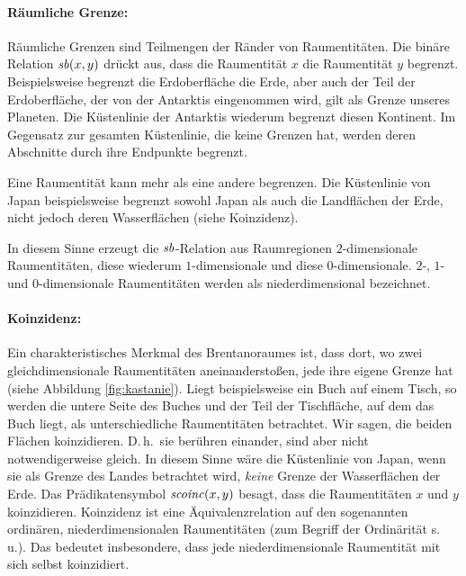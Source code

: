  \paragraph{Räumliche Grenze:}
        Räumliche
        Grenzen sind Teilmengen der Ränder von Raumentitäten.
        Die binäre Relation $\mathit{sb}(x,y)$ drückt aus, dass die Raumentität $x$ die Raumentität $y$ begrenzt. 
        Beispielsweise begrenzt die Erdoberfläche die Erde, aber auch der Teil der Erdoberfläche, der von der Antarktis eingenommen wird, gilt als Grenze unseres Planeten.
        Die Küstenlinie der Antarktis wiederum begrenzt diesen Kontinent.
        Im Gegensatz zur gesamten Küstenlinie, die keine Grenzen hat, werden deren Abschnitte durch ihre Endpunkte begrenzt.
        
        Eine Raumentität kann mehr als eine andere begrenzen. Die Küstenlinie von Japan beispielsweise begrenzt sowohl Japan als auch die Landflächen der Erde, nicht jedoch deren Wasserflächen (siehe Koinzidenz).
        
        In diesem Sinne erzeugt die $\mathit{sb}$-Relation aus Raumregionen $2$-dimensionale Raumentitäten, diese wiederum $1$-dimensionale und diese $0$-dimensionale.
        $2$-, $1$- und $0$-dimensionale Raumentitäten werden als niederdimensional bezeichnet.

    \paragraph{Koinzidenz:}
       Ein
       charakteristisches Merkmal des Brentanoraumes ist, dass dort, wo zwei gleichdimensionale Raumentitäten aneinanderstoßen, jede ihre eigene Grenze hat (siehe Abbildung \ref{fig:kastanie}).
       Liegt beispielsweise ein Buch auf einem Tisch, so werden die untere Seite des Buches und der Teil der Tischfläche, auf dem das Buch liegt, als unterschiedliche Raumentitäten betrachtet. 
       Wir sagen, die beiden Flächen %
       koinzidieren. 
       D.\,h.\ sie berühren einander, sind aber nicht notwendigerweise gleich. 
       In diesem Sinne wäre die Küstenlinie von Japan, wenn sie als Grenze des Landes betrachtet wird, \emph{keine} Grenze der Wasserflächen der Erde.
       Das Prädikatensymbol $\mathit{scoinc}(x,y)$ besagt, dass die Raumentitäten $x$ und $y$ koinzidieren.
       Koinzidenz ist eine Äquivalenzrelation auf den sogenannten ordinären, niederdimensionalen Raumentitäten (zum Begriff der Ordinärität s.\,u.). 
       Das bedeutet insbesondere, dass jede niederdimensionale Raumentität mit sich selbst koinzidiert.
           
